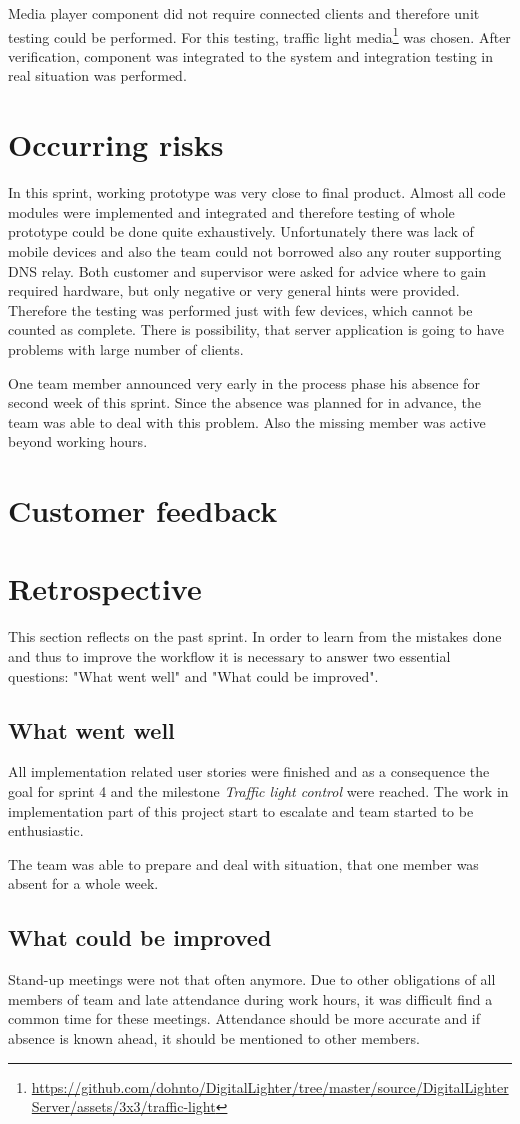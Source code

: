 Media player component did not require connected clients and therefore unit testing could be performed.
For this testing, traffic light media\footnote{\url{https://github.com/dohnto/DigitalLighter/tree/master/source/DigitalLighterServer/assets/3x3/traffic-light}} was chosen.
After verification, component was integrated to the system and integration testing in real situation was performed.

\section{Occurring risks}
In this sprint, working prototype was very close to final product.
Almost all code modules were implemented and integrated and therefore testing of whole prototype could be done quite exhaustively.
Unfortunately there was lack of mobile devices and also the team could not borrowed also any router supporting DNS relay.
Both customer and supervisor were asked for advice where to gain required hardware, but only negative or very general hints were provided.
Therefore the testing was performed just with few devices, which cannot be counted as complete.
There is possibility, that server application is going to have problems with large number of clients.

One team member announced very early in the process phase his absence for second week of this sprint.
Since the absence was planned for in advance, the team was able to deal with this problem.
Also the missing member was active beyond working hours.

\section{Customer feedback}
\section{Retrospective}
This section reflects on the past sprint. In order to learn from the mistakes done and thus to improve the workflow it is necessary to answer two essential questions: "What went well" and "What could be improved".

\subsection{What went well}
All implementation related user stories were finished and as a consequence the goal for sprint 4 and the milestone \emph{Traffic light control} were reached.
The work in implementation part of this project start to escalate and team started to be enthusiastic.

The team was able to prepare and deal with situation, that one member was absent for a whole week.

\subsection{What could be improved}
Stand-up meetings were not that often anymore.
Due to other obligations of all members of team and late attendance during work hours, it was difficult find a common time for these meetings.
Attendance should be more accurate and if absence is known ahead, it should be mentioned to other members.

